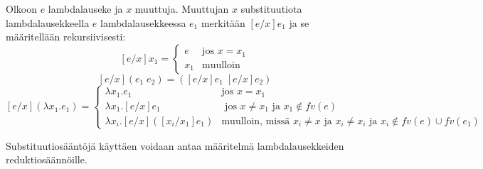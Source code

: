 \begin{maar}[Substituutiosäännöt]
Olkoon $e$ lambdalauseke ja $x$ muuttuja. Muuttujan $x$ substituutiota lambdalausekkeella $e$ lambdalausekkeessa $e_{1}$ merkitään $[e/x] e_{1}$ ja se määritellään rekursiivisesti:  
\[[e/x]x_{1} = 
	\begin{cases}
		e & \text{jos } x = x_{1} \\
		x_{1} & \text{muulloin}
	\end{cases}
\]
\[ [e/x](e_{1} \; e_{2}) = ([e/x]e_{1} \; [e/x]e_{2}) \]
\[[e/x](\lambda x_{1}.e_{1}) = 
	\begin{cases}
		\lambda x_{1}.e_{1} & \text{jos } x = x_{1} \\
		\lambda x_{1}.[e/x]e_{1} & \text{ jos } x \neq x_{1} \text{ ja } x_{1} \notin fv(e) \\
		\lambda x_{i}.[e/x]([x_{i}/x_{1}]e_{1}) & \text{muulloin, missä } x_{i} \neq x \text { ja } x_{i} \neq x_{i} \text{ ja } x_{i} \notin fv(e) \cup fv(e_{1})
	\end{cases}
\]
\end{maar} 

Substituutiosääntöjä käyttäen voidaan antaa määritelmä lambdalausekkeiden reduktiosäännöille.

